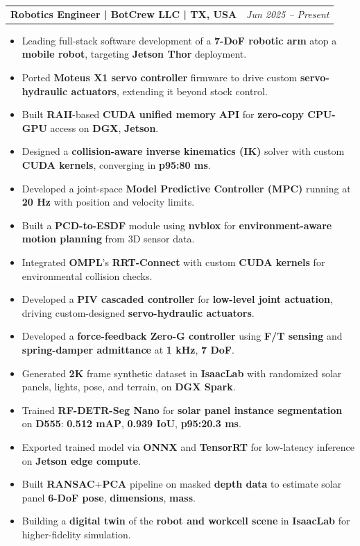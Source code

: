 \documentclass[a4paper,11pt]{article}
\makeatletter
\newcommand{\resumeExp}[2]{
\vspace{0mm}\item[]
    \begin{tabular*}{\textwidth}[t]{l@{\extracolsep{\fill}}r}
        \hspace{-4.4mm} \small\textbf{#1} & {\footnotesize{#2}} \vspace{-1.2mm} %
    \end{tabular*}
    \vspace*{-7mm}
}
\newcommand{\resumeItemListStart}{\begin{justify}\begin{itemize}[leftmargin=1.5ex, rightmargin=2ex, noitemsep,labelsep=1.2mm,itemsep=1mm]\small}
\newcommand{\resumeItemListEnd}{\end{itemize}\end{justify}}%
\makeatother
\begin{document}
\resumeExp
{Robotics Engineer\textnormal{ | BotCrew LLC | TX, USA}}
{\textit{Jun 2025 – Present}}
\resumeItemListStart
\item[$\bullet$] Leading full-stack software development of a \textbf{7-DoF robotic arm} atop a \textbf{mobile robot}, targeting \textbf{Jetson Thor} deployment.
\item[$\bullet$] Ported \textbf{Moteus X1 servo controller} firmware to drive custom \textbf{servo-hydraulic actuators}, extending it beyond stock control.
\item[$\bullet$] Built \textbf{RAII}-based \textbf{CUDA} \textbf{unified memory} \textbf{API} for \textbf{zero-copy CPU-GPU} access on \textbf{DGX}, \textbf{Jetson}.
\item[$\bullet$] Designed a \textbf{collision-aware inverse kinematics (IK)} solver with custom \textbf{CUDA kernels}, converging in \textbf{p95:80 ms}.
\item[$\bullet$] Developed a joint-space \textbf{Model Predictive Controller (MPC)} running at \textbf{20 Hz} with position and velocity limits.
\item[$\bullet$] Built a \textbf{PCD-to-ESDF} module using \textbf{nvblox} for \textbf{environment-aware motion planning} from 3D sensor data.
\item[$\bullet$] Integrated \textbf{OMPL}'s \textbf{RRT-Connect} with custom \textbf{CUDA kernels} for environmental collision checks.
\item[$\bullet$] Developed a \textbf{PIV cascaded controller} for \textbf{low-level joint actuation}, driving custom-designed \textbf{servo-hydraulic actuators}.
\item[$\bullet$] Developed a \textbf{force-feedback Zero-G controller} using \textbf{F/T sensing} and \textbf{spring-damper admittance} at \textbf{1 kHz}, \textbf{7 DoF}.
\item[$\bullet$] Generated \textbf{2K} frame synthetic dataset in \textbf{IsaacLab} with randomized solar panels, lights, pose, and terrain, on \textbf{DGX Spark}.
\item[$\bullet$] Trained \textbf{RF-DETR-Seg Nano} for \textbf{solar panel instance segmentation} on \textbf{D555}: \textbf{0.512 mAP}, \textbf{0.939 IoU}, \textbf{p95:20.3 ms}.
\item[$\bullet$] Exported trained model via \textbf{ONNX} and \textbf{TensorRT} for low-latency inference on \textbf{Jetson edge compute}.
\item[$\bullet$] Built \textbf{RANSAC}+\textbf{PCA} pipeline on masked \textbf{depth data} to estimate solar panel \textbf{6-DoF pose}, \textbf{dimensions}, \textbf{mass}.
\item[$\bullet$] Building a \textbf{digital twin} of the \textbf{robot and workcell scene} in \textbf{IsaacLab} for higher-fidelity simulation.
\resumeItemListEnd
\end{document}

